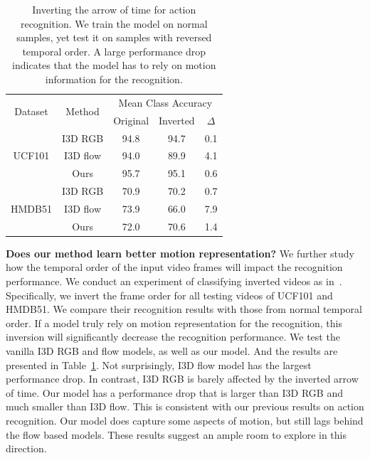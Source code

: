 \documentclass[10pt,twocolumn,letterpaper]{article}
\begin{document}
\begin{table}[t]
\centering
\footnotesize
\begin{tabular}{c|c|ccc}
\multirow{2}{*}{Dataset}        & \multirow{2}{*}{Method}   & \multicolumn{3}{c}{Mean Class Accuracy} \\
    &                           & Original   & Inverted &  $\Delta$ \\ \hline 

\multirow{3}{*}{UCF101}         & I3D RGB  & 94.8 & 94.7     & 0.1  \\
                                & I3D flow & 94.0 & 89.9     & 4.1  \\ 
                                & Ours     & 95.7 & 95.1     &0.6   \\  \hline
\multirow{3}{*}{HMDB51}         & I3D RGB  & 70.9 & 70.2     & 0.7  \\
                                & I3D flow & 73.9 & 66.0     & 7.9 \\ 
                                & Ours     & 72.0 & 70.6     & 1.4  \\
\end{tabular}
\vspace{0.1em}
\caption{Inverting the arrow of time for action recognition. We train the model on normal samples, yet test it on samples with reversed temporal order. A large performance drop indicates that the model has to rely on motion information for the recognition. }
\label{table:arrow}
\end{table}

\noindent \textbf{Does our method learn better motion representation?} We further study how the temporal order of the input video frames will impact the recognition performance. We conduct an experiment of classifying inverted videos as in~\cite{Xie_2018_ECCV, zhou2017temporal}. Specifically, we invert the frame order for all testing videos of UCF101 and HMDB51. We compare their recognition results with those from normal temporal order. If a model truly rely on motion representation for the recognition, this inversion will significantly decrease the recognition performance. We test the vanilla I3D RGB and flow models, as well as our model. And the results are presented in Table~\ref{table:arrow}. Not surprisingly, I3D flow model has the largest performance drop. In contrast, I3D RGB is barely affected by the inverted arrow of time. Our model has a performance drop that is larger than I3D RGB and much smaller than I3D flow. This is consistent with our previous results on action recognition. Our model does capture some aspects of motion, but still lags behind the flow based models. These results suggest an ample room to explore in this direction. 
\end{document}
